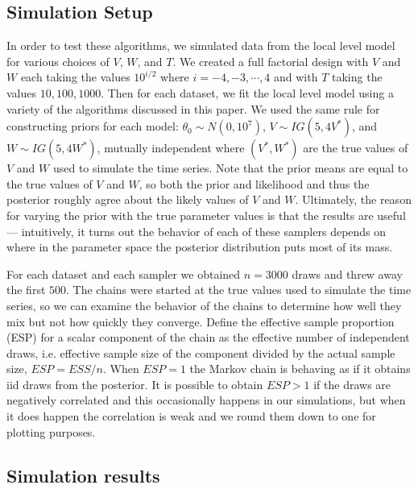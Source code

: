 \documentclass[12pt]{article}
\begin{document}
\subsection{Simulation Setup}

In order to test these algorithms, we simulated data from the local level model for various choices of $V$, $W$, and $T$. We created a full factorial design with $V$ and $W$ each taking the values $10^{i/2}$ where $i=-4,-3,\cdots,4$ and with $T$ taking the values $10, 100, 1000$. Then for each dataset, we fit the local level model using a variety of the algorithms discussed in this paper. We used the same rule for constructing priors for each model: $\theta_0\sim N(0,10^7)$, $V\sim IG(5, 4V^*)$, and $W\sim IG(5, 4W^*)$, mutually independent where $(V^*,W^*)$ are the true values of $V$ and $W$ used to simulate the time series. Note that the prior means are equal to the true values of $V$ and $W$, so both the prior and likelihood and thus the posterior roughly agree about the likely values of $V$ and $W$. Ultimately, the reason for varying the prior with the true parameter values is that the results are useful --- intuitively, it turns out the behavior of each of these samplers depends on where in the parameter space the posterior distribution puts most of its mass.

For each dataset and each sampler we obtained $n=3000$ draws and threw away the first $500$. The chains were started at the true values used to simulate the time series, so we can examine the behavior of the chains to determine how well they mix but not how quickly they converge. Define the effective sample proportion (ESP) for a scalar component of the chain as the effective number of independent draws, i.e. effective sample size \citep{gelman2013bayesian} of the component divided by the actual sample size, $ESP=ESS/n$. When $ESP=1$ the Markov chain is behaving as if it obtains iid draws from the posterior. It is possible to obtain $ESP>1$ if the draws are negatively correlated and this occasionally happens in our simulations, but when it does happen the correlation is weak and we round them down to one for plotting purposes.

\subsection{Simulation results}
\end{document}
